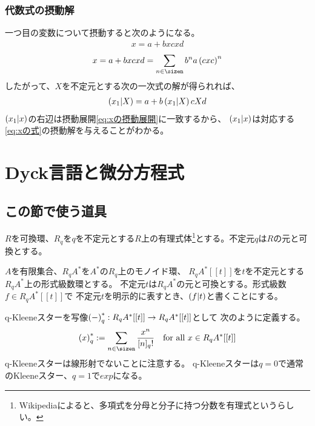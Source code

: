 {\subsubsection{代数式の摂動解}\label{s3:代数式の摂動解} %
	一つ目の変数について摂動すると次のようになる。
	\begin{equation}\label{eq:xの式}\begin{split}
		x = a + bxcxd
	\end{split}\end{equation}
	\begin{equation}\label{eq:xの摂動展開}\begin{split}
		x = a + bxcxd = \sum_{n\in\sizen} b^na\lr{cxc}^n
	\end{split}\end{equation}
	したがって、$X$を不定元とする次の一次式の解が得られれば、
	\begin{equation*}\begin{split}
		\left({x_1|X}\right) = a + b\left({x_1|X}\right)cXd
	\end{split}\end{equation*}
	$\left({x_1|x}\right)$の右辺は摂動展開\eqref{eq:xの摂動展開}に一致するから、
	$\left({x_1|x}\right)$は対応する\eqref{eq:xの式}の摂動解を与えることがわかる。
\section{Dyck言語と微分方程式}\label{s1:Dyck言語と微分方程式} %
\subsection{この節で使う道具}\label{s2:この節で使う道具} %
	$R$を可換環、$R_q$を$q$を不定元とする$R$上の有理式体\footnote{
		Wikipediaによると、多項式を分母と分子に持つ分数を有理式というらしい。
	}とする。不定元$q$は$R$の元と可換とする。

	$A$を有限集合、$R_qA^*$を$A^*$の$R_q$上のモノイド環、
	$R_qA^*[[t]]$を$t$を不定元とする$R_qA^*$上の形式級数環とする。
	不定元$t$は$R_qA^*$の元と可換とする。形式級数$f\in R_qA^*[[t]]$で
	不定元$t$を明示的に表すとき、$\left({f|t}\right)$と書くことにする。

	q-Kleeneスターを写像$\left({-}\right)_q^*:R_qA^*[[t]]\to R_qA^*[[t]]$として
	次のように定義する。
	\begin{equation*}\begin{split}
		\lr{x}_q^* := \sum_{n\in\sizen}\frac{x^n}{[n]_q!}
		\quad\text{for all } x\in R_qA^*[[t]]
	\end{split}\end{equation*}
	q-Kleeneスターは線形射でないことに注意する。
	q-Kleeneスターは$q=0$で通常のKleeneスター、$q=1$で$exp$になる。

}
